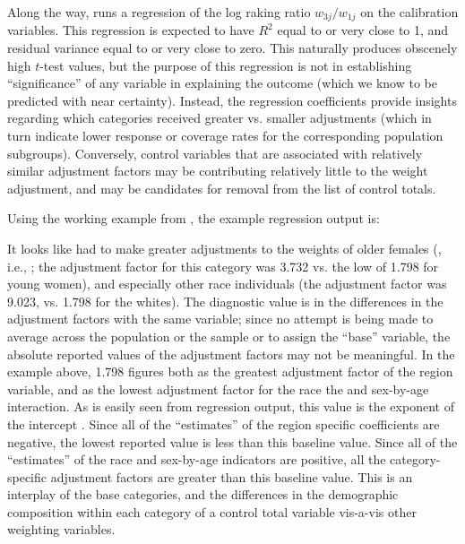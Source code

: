 Along the way,  runs a regression of the log raking ratio $w_{3j}/w_{1j}$
on the calibration variables. This regression is expected to have $R^2$ equal to or very close to 1,
and residual variance equal to or very close to zero. This naturally produces obscenely
high $t$-test values, but the purpose of this regression is not in establishing
``significance'' of any variable in explaining the outcome (which we know to be predicted
with near certainty).
Instead, the regression coefficients provide insights regarding which categories received
greater vs. smaller adjustments (which in turn indicate lower response or coverage rates
for the corresponding population subgroups). Conversely, control variables that are
associated with relatively similar adjustment factors may be contributing relatively
little to the weight adjustment, and may be candidates for removal from the list of control totals.

Using the working example from \citet{kolenikov:2014}, the example regression output is:

\begin{stlog}


\nullskip
\end{stlog}

It looks like  had to make greater adjustments to the weights 
of older females (, i.e., ; 
the adjustment factor for this category was 3.732 vs. the low of 1.798 for young women),
and especially other race individuals (the adjustment factor was 9.023,
vs. 1.798 for the whites). The diagnostic value is in the differences in the adjustment
factors with the same variable; since no attempt is being made to average
across the population or the sample or to assign the ``base'' variable, 
the absolute reported values of the adjustment factors may not be
meaningful. In the example above, 1.798 figures both as the greatest adjustment
factor of the region variable, and as the lowest adjustment factor
for the race the and sex-by-age interaction. As is easily seen from regression
output, this value is the exponent of the intercept .
Since all of the ``estimates'' of the region specific coefficients are negative,
the lowest reported value is less than this baseline value. Since all of the
``estimates'' of the race and sex-by-age indicators are positive, all 
the category-specific adjustment factors are greater than this baseline value.
This is an interplay of the base categories, and the differences in the 
demographic composition within each category of a control total variable
vis-a-vis other weighting variables.

